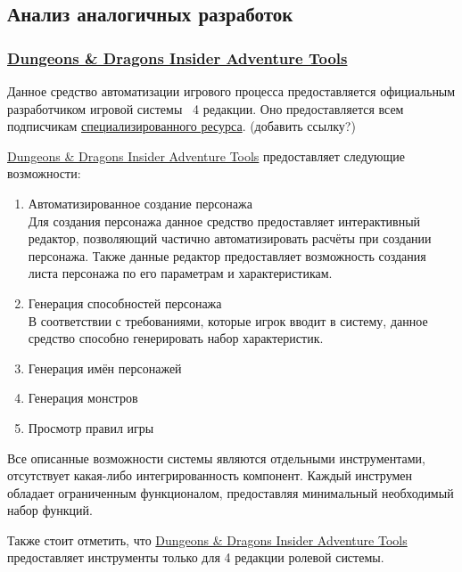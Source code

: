 \subsection{Анализ аналогичных разработок}


\subsubsection{\href{http://www.wizards.com/dnd/Tool.aspx?x=dnd/4new/tool/adventuretools}{Dungeons \& Dragons Insider Adventure Tools}}
Данное средство автоматизации игрового процесса предоставляется официальным разработчиком игровой системы \dnd\ 4 редакции. Оно предоставляется всем подписчикам \href{http://www.wizards.com/dnd}{специализированного ресурса}. (добавить ссылку?)

\href{http://www.wizards.com/dnd/Tool.aspx?x=dnd/4new/tool/adventuretools}{Dungeons \& Dragons Insider Adventure Tools} предоставляет следующие возможности:
\begin{enumerate}
\item Автоматизированное создание персонажа\\
Для создания персонажа данное средство предоставляет интерактивный редактор, позволяющий частично автоматизировать расчёты при создании персонажа. Также данные редактор предоставляет возможность создания листа персонажа по его параметрам и характеристикам.
\item Генерация способностей персонажа\\
В соответствии с требованиями, которые игрок вводит в систему, данное средство способно генерировать набор характеристик.
\item Генерация имён персонажей
\item Генерация монстров
\item Просмотр правил игры
\end{enumerate}

Все описанные возможности системы являются отдельными инструментами, отсутствует какая-либо интегрированность компонент. Каждый инструмен обладает ограниченным функционалом, предоставляя минимальный необходимый набор функций.

Также стоит отметить, что \href{http://www.wizards.com/dnd/Tool.aspx?x=dnd/4new/tool/adventuretools}{Dungeons \& Dragons Insider Adventure Tools} предоставляет инструменты только для 4 редакции ролевой системы.
